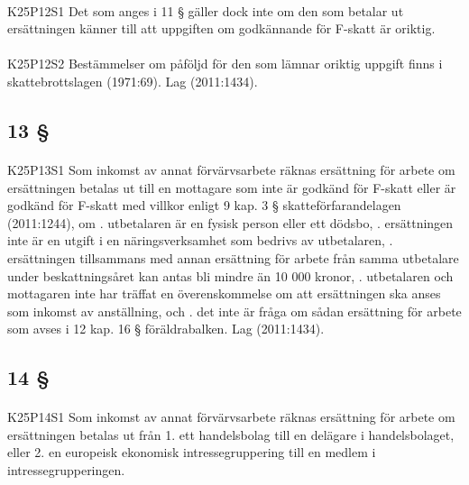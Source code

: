 \documentclass[a4paper,notitlepage,openany,10pt]{book}
\begin{document}
\paragraph*{}
{\tiny K25P12S1}
Det som anges i 11 § gäller dock inte om den som betalar ut ersättningen känner till att uppgiften om godkännande för F-skatt är oriktig.
\paragraph*{}
{\tiny K25P12S2}
Bestämmelser om påföljd för den som lämnar oriktig uppgift finns i skattebrottslagen (1971:69).
Lag (2011:1434).
\subsection*{13 §}
\paragraph*{}
{\tiny K25P13S1}
Som inkomst av annat förvärvsarbete räknas ersättning för arbete om ersättningen betalas ut till en mottagare som inte är godkänd för F-skatt eller är godkänd för F-skatt med villkor enligt 9 kap. 3 § skatteförfarandelagen (2011:1244), om
. utbetalaren är en fysisk person eller ett dödsbo,
. ersättningen inte är en utgift i en näringsverksamhet som bedrivs av utbetalaren,
. ersättningen tillsammans med annan ersättning för arbete från samma utbetalare under beskattningsåret kan antas bli mindre än 10 000 kronor,
. utbetalaren och mottagaren inte har träffat en överenskommelse om att ersättningen ska anses som inkomst av anställning, och
. det inte är fråga om sådan ersättning för arbete som avses i 12 kap. 16 § föräldrabalken.
Lag (2011:1434).
\subsection*{14 §}
\paragraph*{}
{\tiny K25P14S1}
Som inkomst av annat förvärvsarbete räknas ersättning för arbete om ersättningen betalas ut från 1. ett handelsbolag till en delägare i handelsbolaget, eller 2. en europeisk ekonomisk intressegruppering till en medlem i intressegrupperingen.
\end{document}
